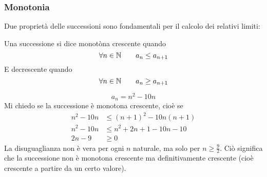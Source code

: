 \subsubsection{Monotonia}
Due proprietà delle successioni sono fondamentali per il calcolo dei relativi limiti:
\begin{defin}[Monotonia]
	Una successione si dice monotòna crescente quando
	\[
		\forall n\in\mathbb{N} \qquad a_n\leq a_{n+1}
	\]
	E decrescente quando
	\[
		\forall n\in\mathbb{N} \qquad a_n\geq a_{n+1}
	\]
\end{defin}
\begin{examp}
	\[
		a_n=n^2-10n
	\]
	Mi chiedo se la successione è monotona crescente, cioè se
	\begin{align*}
		n^2-10n & \leq(n+1)^2-10n(n+1) \\
		n^2-10n & \leq n^2+2n+1-10n-10 \\
		2n-9    & \geq0
	\end{align*}
	La disuguaglianza non è vera per ogni $n$ naturale, ma solo per $n\geq\frac{9}{2}$. Ciò significa che la successione non è monotona crescente ma definitivamente crescente (cioè crescente a partire da un certo valore).
\end{examp}

